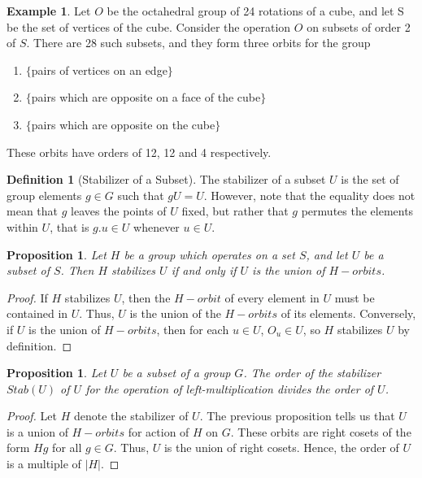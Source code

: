 \documentclass[12pt]{article}
\newtheorem{prop}[thm]{Proposition}
\theoremstyle{definition}
\newtheorem{defn}[thm]{Definition}
\newtheorem{eg}[thm]{Example}
\theoremstyle{remark}
\numberwithin{equation}{section}
\begin{document}
\vspace{15pt}

\begin{eg}
        Let $O$ be the octahedral group of 24 rotations of a cube, and let S be the set of vertices of the cube. Consider the operation $O$ on subsets of order 2 of $S$. There are 28 such subsets, and they form three orbits for the group \begin{enumerate}
                \item $\{$pairs of vertices on an edge$\}$
                \item $\{$pairs which are opposite on a face of the cube$\}$
                \item $\{$pairs which are opposite on the cube$\}$
        \end{enumerate}
        These orbits have orders of 12, 12 and 4 respectively.
\end{eg}

\vspace{15pt}

\begin{defn}[Stabilizer of a Subset]
        The stabilizer of a subset $U$ is the set of group elements $g \in G$ such that $gU=U$. However, note that the equality does not mean that $g$ leaves the points of $U$ fixed, but rather that $g$ permutes the elements within $U$, that is $g.u\in U$ whenever $u \in U$.
\end{defn}

\vspace{15pt}

\begin{prop}
        Let $H$ be a group which operates on a set $S$, and let $U$ be a subset of $S$. Then $H$ stabilizes $U$ if and only if $U$ is the union of $H-orbits$.
\end{prop}
\begin{proof}
        If $H$ stabilizes $U$, then the $H-orbit$ of every element in $U$ must be contained in $U$. Thus, $U$ is the union of the $H-orbits$ of its elements. Conversely, if $U$ is the union of $H-orbits$, then for each $u \in U$, $O_u \in U$, so $H$ stabilizes $U$ by definition.
\end{proof}

\vspace{15pt}


\begin{prop}
        Let $U$ be a subset of a group $G$. The order of the stabilizer $Stab(U)$ of $U$ for the operation of left-multiplication divides the order of $U$.
\end{prop}
\begin{proof}
        Let $H$ denote the stabilizer of $U$. The previous proposition tells us that $U$ is a union of $H-orbits$ for action of $H$ on $G$. These orbits are right cosets of the form $Hg$ for all $g \in G$. Thus, $U$ is the union of right cosets. Hence, the order of $U$ is a multiple of $|H|$.
\end{proof}
\end{document}
